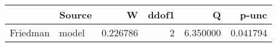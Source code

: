 \begin{tabular}{llrrrr}
\toprule
 & Source & W & ddof1 & Q & p-unc \\
\midrule
Friedman & model & 0.226786 & 2 & 6.350000 & 0.041794 \\
\bottomrule
\end{tabular}
